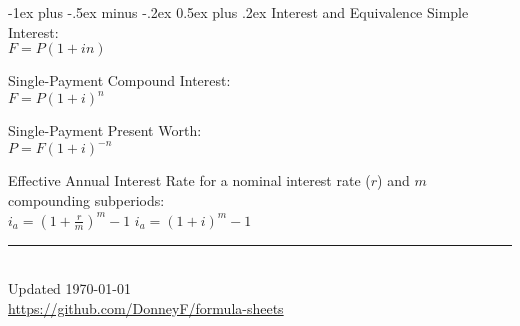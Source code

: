 \documentclass[12pt,landscape]{article}
\makeatletter
\renewcommand{\section}{\@startsection{section}{1}{0mm}%
                                {-1ex plus -.5ex minus -.2ex}%
                                {0.5ex plus .2ex}%
                                {\normalfont\normalsize\bfseries}}
\newcommand{\tab}{\hspace{.02\textwidth}}
\newcommand{\ds}{\displaystyle}
\makeatother
\begin{document}
\begin{multicols*}{3}
\section{Interest and Equivalence}
Simple Interest:\\
\tab $F = P(1 + in)$

Single-Payment Compound Interest:\\
\tab $F = P(1 + i)^n$

Single-Payment Present Worth:\\
\tab $P = F(1 + i)^{-n}$

Effective Annual Interest Rate for a nominal interest rate ($r$) and $m$ compounding subperiods:\\
\tab $\ds i_a = \left(1+ \frac{r}{m}\right)^m -1$ \qquad $i_a = (1 + i)^m-1$

\rule{0.3\linewidth}{0.25pt}
\scriptsize\\
Updated \today\\
\href{https://github.com/DonneyF/formula-sheets}{https://github.com/DonneyF/formula-sheets}
\end{multicols*}
\end{document}
